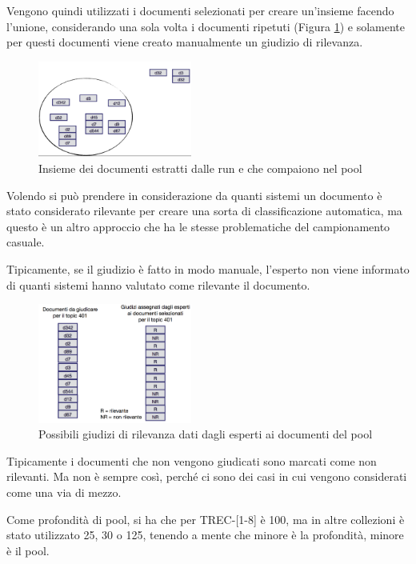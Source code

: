 Vengono quindi utilizzati i documenti selezionati per creare un'insieme facendo l'unione, considerando una sola volta i documenti ripetuti (Figura \ref{fig:pool-union}) e solamente per questi documenti viene creato manualmente un giudizio di rilevanza.

\begin{figure}[htbp]
	\centering
	\includegraphics[width=0.45\textwidth]{images/l14-fig-3.png}
	\caption{Insieme dei documenti estratti dalle run e che compaiono nel pool}\label{fig:pool-union}
\end{figure}

Volendo si può prendere in considerazione da quanti sistemi un documento è stato considerato rilevante per creare una sorta di classificazione automatica, ma questo è un altro approccio che ha le stesse problematiche del campionamento casuale.

Tipicamente, se il giudizio è fatto in modo manuale, l'esperto non viene informato di quanti sistemi hanno valutato come rilevante il documento.

\begin{figure}[htbp]
	\centering
	\includegraphics[width=0.45\textwidth]{images/l14-fig-4.png}
	\caption{Possibili giudizi di rilevanza dati dagli esperti ai documenti del pool}
\end{figure}

Tipicamente i documenti che non vengono giudicati sono marcati come non rilevanti. Ma non è sempre così, perché ci sono dei casi in cui vengono considerati come una via di mezzo.

Come profondità di pool, si ha che per TREC-[1-8] è 100, ma in altre collezioni è stato utilizzato 25, 30 o 125, tenendo a mente che minore è la profondità, minore è il pool.

